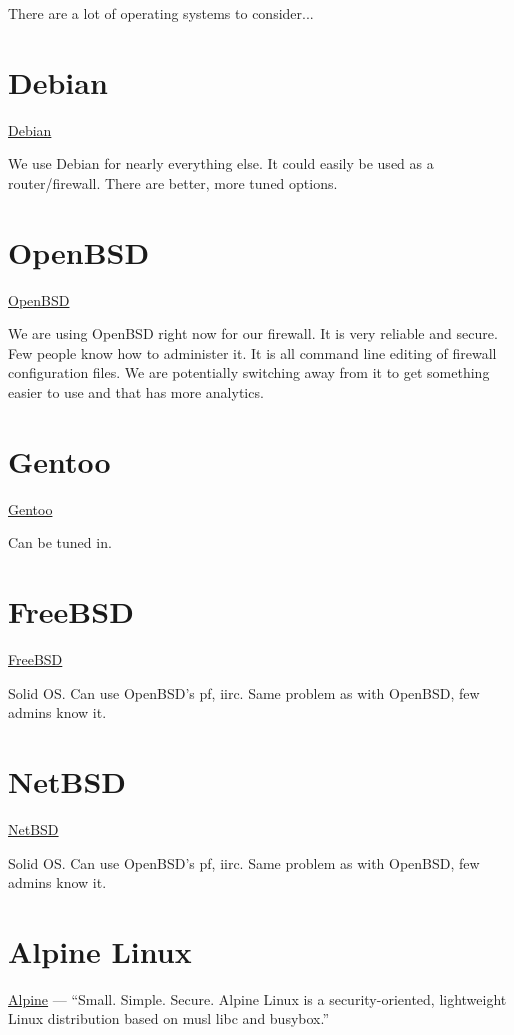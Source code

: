 %
%
%
%
%
There are a lot of operating systems to consider...


\section{Debian}
 \href{https://www.debian.org/}{Debian}

We use Debian for nearly everything else. It could easily be used as a router/firewall. There are better, more tuned options.


\section{OpenBSD}
 \href{https://www.openbsd.org/}{OpenBSD}

We are using OpenBSD right now for our firewall. It is very reliable and secure. Few people know how to administer it. It is all command line editing of
firewall configuration files. We are potentially switching away from it to get something easier to use and that has more analytics.


\section{Gentoo}
 \href{https://www.gentoo.org/}{Gentoo}

Can be tuned in.


\section{FreeBSD}
 \href{https://www.freebsd.org/}{FreeBSD}

Solid OS. Can use OpenBSD's pf, iirc. Same problem as with OpenBSD, few admins know it.


\section{NetBSD}
 \href{https://www.netbsd.org/}{NetBSD}

Solid OS. Can use OpenBSD's pf, iirc. Same problem as with OpenBSD, few admins know it.


\section{Alpine Linux}
 \href{https://www.alpinelinux.org/}{Alpine} --- ``Small. Simple. Secure. Alpine Linux is a security-oriented, lightweight Linux distribution based on musl libc and busybox.''

